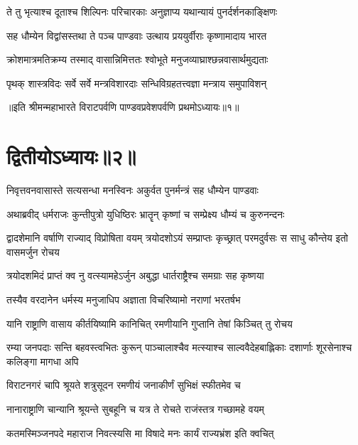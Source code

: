 \twolineshloka
{ते तु भृत्याश्च दूताश्च शिल्पिनः परिचारकाः}
{अनुज्ञाप्य यथान्यायं पुनर्दर्शनकाङ्क्षिणः}


\twolineshloka
{सह धौम्येन विद्वांसस्तथा ते पञ्च पाण्डवाः}
{उत्थाय प्रययुर्वीराः कृष्णामादाय भारत}


\twolineshloka
{क्रोशमात्रमतिक्रम्य तस्माद् वासान्निमित्ततः}
{श्वोभूते मनुजव्याघ्राश्छन्नवासार्थमुद्यताः}


\twolineshloka
{पृथक् शास्त्रविदः सर्वे सर्वे मन्त्रविशारदाः}
{सन्धिविग्रहतत्त्वज्ञा मन्त्राय समुपाविशन्}

॥इति श्रीमन्महाभारते विराटपर्वणि पाण्डवप्रवेशपर्वणि प्रथमोऽध्यायः॥१॥

\chapter{द्वितीयोऽध्यायः॥२॥}

\twolineshloka
{निवृत्तवनवासास्ते सत्यसन्धा मनस्विनः}
{अकुर्वत पुनर्मन्त्रं सह धौम्येन पाण्डवाः}


\twolineshloka
{अथाब्रवीद् धर्मराजः कुन्तीपुत्रो युधिष्ठिरः}
{भ्रातॄन् कृष्णां च सम्प्रेक्ष्य धौम्यं च कुरुनन्दनः}


\threelineshloka
{द्वादशेमानि वर्षाणि राज्याद् विप्रोषिता वयम्}
{त्रयोदशोऽयं सम्प्राप्तः कृच्छ्रात् परमदुर्वसः}
{स साधु कौन्तेय इतो वासमर्जुन रोचय}


\twolineshloka
{त्रयोदशमिदं प्राप्तं क्व नु वत्स्यामहेऽर्जुन}
{अबुद्धा धार्तराष्ट्रैश्च समग्राः सह कृष्णया}




\twolineshloka
{तस्यैव वरदानेन धर्मस्य मनुजाधिप}
{अज्ञाता विचरिष्यामो नराणां भरतर्षभ}


\twolineshloka
{यानि राष्ट्राणि वासाय कीर्तयिष्यामि कानिचित्}
{रमणीयानि गुप्तानि तेषां किञ्चित् तु रोचय}


\threelineshloka
{रम्या जनपदाः सन्ति बहवस्त्वभितः कुरून्}
{पाञ्चालाश्चैव मत्स्याश्च साल्ववैदेहबाह्लिकाः}
{दशार्णाः शूरसेनाश्च कलिङ्गा मागधा अपि}


\twolineshloka
{विराटनगरं चापि श्रूयते शत्रुसूदन}
{रमणीयं जनाकीर्णं सुभिक्षं स्फीतमेव च}


\twolineshloka
{नानाराष्ट्राणि चान्यानि श्रूयन्ते सुबहूनि च}
{यत्र ते रोचते राजंस्तत्र गच्छामहे वयम्}


\twolineshloka
{कतमस्मिञ्जनपदे महाराज निवत्स्यसि}
{मा विषादे मनः कार्यं राज्यभ्रंश इति क्वचित्}




